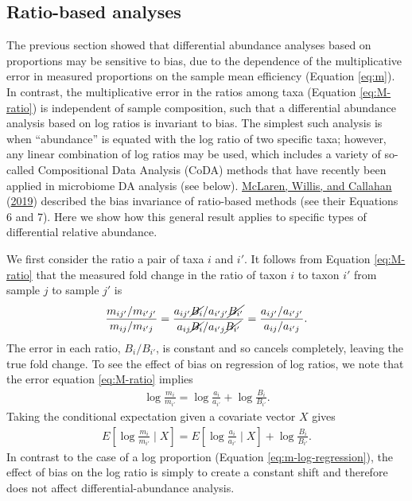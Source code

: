 \documentclass[
]{article}
\theoremstyle{definition}
\theoremstyle{definition}
\theoremstyle{definition}
\theoremstyle{definition}
\theoremstyle{remark}
\begin{document}
\hypertarget{ratio-based-analyses}{%
\subsection{Ratio-based analyses}\label{ratio-based-analyses}}

The previous section showed that differential abundance analyses based on proportions may be sensitive to bias, due to the dependence of the multiplicative error in measured proportions on the sample mean efficiency (Equation \eqref{eq:m}).
In contrast, the multiplicative error in the ratios among taxa (Equation \eqref{eq:M-ratio}) is independent of sample composition, such that a differential abundance analysis based on log ratios is invariant to bias.
The simplest such analysis is when ``abundance'' is equated with the log ratio of two specific taxa; however, any linear combination of log ratios may be used, which includes a variety of so-called Compositional Data Analysis (CoDA) methods that have recently been applied in microbiome DA analysis (see below).
\protect\hyperlink{ref-mclaren2019cons}{McLaren, Willis, and Callahan} (\protect\hyperlink{ref-mclaren2019cons}{2019}) described the bias invariance of ratio-based methods (see their Equations 6 and 7).
Here we show how this general result applies to specific types of differential relative abundance.

We first consider the ratio a pair of taxa \(i\) and \(i'\).
It follows from Equation \eqref{eq:M-ratio} that the measured fold change in the ratio of taxon \(i\) to taxon \(i'\) from sample \(j\) to sample \(j'\) is
\begin{align}
  \label{eq:M-ratio-fc}
  \frac{m_{ij'} / m_{i'j'}}{m_{ij} / m_{i'j}}
  = \frac{a_{ij'} \cancel{B_i} / a_{i'j'} \cancel{B_{i'}}}
         {a_{ij} \cancel{B_i} / a_{i'j} \cancel{B_{i'}}}
  = \frac{a_{ij'} / a_{i'j'}}{a_{ij} / a_{i'j}}.
\end{align}
The error in each ratio, \(B_i / B_{i'}\), is constant and so cancels completely, leaving the true fold change.
To see the effect of bias on regression of log ratios, we note that the error equation \eqref{eq:M-ratio} implies
\begin{align}
  \label{eq:M-ratio-log}
  \log \frac{m_i}{m_{i'}} = \log \frac{a_i}{a_{i'}} + \log \frac{B_i}{B_{i'}}.
\end{align}
Taking the conditional expectation given a covariate vector \(X\) gives
\begin{align}
  \label{eq:m-ratio-log-regression}
  E\left[ \log \frac{m_i}{m_{i'}} \mid X \right] 
  = E\left[ \log \frac{a_i}{a_{i'}} \mid X \right] + \log \frac{B_i}{B_{i'}}.
\end{align}
In contrast to the case of a log proportion (Equation \eqref{eq:m-log-regression}), the effect of bias on the log ratio is simply to create a constant shift and therefore does not affect differential-abundance analysis.
\end{document}
